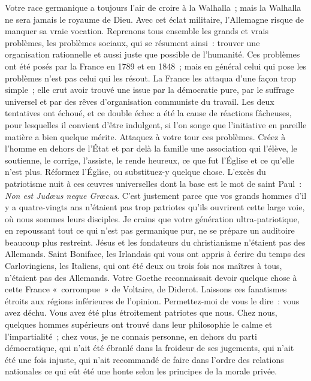 \documentclass[french,twoside]{book} %
\begin{document}
Votre race germanique a toujours l’air de croire à la Walhalla ; mais la Walhalla ne sera jamais le royaume de Dieu. Avec cet éclat militaire, l’Allemagne risque de manquer sa vraie vocation. Reprenons tous ensemble les grands et vrais problèmes, les problèmes sociaux, qui se résument ainsi : trouver une organisation rationnelle et aussi juste que possible de l’humanité. Ces problèmes ont été posés par la France en 1789 et en 1848 ; mais en général celui qui pose les problèmes n’est pas celui qui les résout. La France les attaqua d’une façon trop simple ; elle crut avoir trouvé une issue par la démocratie pure, par le suffrage universel et par des rêves d’organisation communiste du travail. Les deux tentatives ont échoué, et ce double échec a été la cause de réactions fâcheuses, pour lesquelles il convient d’être indulgent, si l’on songe que l’initiative en pareille matière a bien quelque mérite. Attaquez à votre tour ces problèmes. Créez à l’homme en dehors de l’État et par delà la famille une association qui l’élève, le soutienne, le corrige, l’assiste, le rende heureux, ce que fut l’Église et ce qu’elle n’est plus. Réformez l’Église, ou substituez-y quelque chose. L’excès du patriotisme nuit à ces œuvres universelles dont la base est le mot de saint Paul : {\itshape Non est Judœus neque Grœcus}. C’est justement parce que vos grands hommes d’il y a quatre-vingts ans n’étaient pas trop patriotes qu’ils ouvrirent cette large voie, où nous sommes leurs disciples. Je crains que votre génération ultra-patriotique, en repoussant tout ce qui n’est pas germanique pur, ne se prépare un auditoire beaucoup plus restreint. Jésus et les fondateurs du christianisme n’étaient pas des Allemands. Saint Boniface, les Irlandais qui vous ont appris à écrire du temps des Carlovingiens, les Italiens, qui ont été deux ou trois fois nos maîtres à tous, n’étaient pas des Allemands. Votre Goethe reconnaissait devoir quelque chose à cette France « corrompue » de Voltaire, de Diderot. Laissons ces fanatismes étroits aux régions inférieures de l’opinion. Permettez-moi de vous le dire : vous avez déchu. Vous avez été plus étroitement patriotes que nous. Chez nous, quelques hommes supérieurs ont trouvé dans leur philosophie le calme et l’impartialité ; chez vous, je ne connais personne, en dehors du parti démocratique, qui n’ait été ébranlé dans la froideur de ses jugements, qui n’ait été une fois injuste, qui n’ait recommandé de faire dans l’ordre des relations nationales ce qui eût été une honte selon les principes de la morale privée.\par
\end{document}
